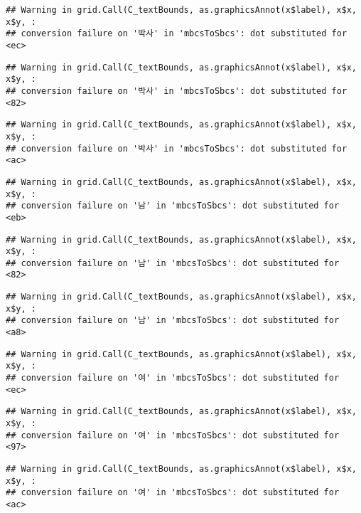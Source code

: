 \documentclass[
]{article}
\begin{document}
\begin{verbatim}
## Warning in grid.Call(C_textBounds, as.graphicsAnnot(x$label), x$x, x$y, :
## conversion failure on '박사' in 'mbcsToSbcs': dot substituted for <ec>
\end{verbatim}

\begin{verbatim}
## Warning in grid.Call(C_textBounds, as.graphicsAnnot(x$label), x$x, x$y, :
## conversion failure on '박사' in 'mbcsToSbcs': dot substituted for <82>
\end{verbatim}

\begin{verbatim}
## Warning in grid.Call(C_textBounds, as.graphicsAnnot(x$label), x$x, x$y, :
## conversion failure on '박사' in 'mbcsToSbcs': dot substituted for <ac>
\end{verbatim}

\begin{verbatim}
## Warning in grid.Call(C_textBounds, as.graphicsAnnot(x$label), x$x, x$y, :
## conversion failure on '남' in 'mbcsToSbcs': dot substituted for <eb>
\end{verbatim}

\begin{verbatim}
## Warning in grid.Call(C_textBounds, as.graphicsAnnot(x$label), x$x, x$y, :
## conversion failure on '남' in 'mbcsToSbcs': dot substituted for <82>
\end{verbatim}

\begin{verbatim}
## Warning in grid.Call(C_textBounds, as.graphicsAnnot(x$label), x$x, x$y, :
## conversion failure on '남' in 'mbcsToSbcs': dot substituted for <a8>
\end{verbatim}

\begin{verbatim}
## Warning in grid.Call(C_textBounds, as.graphicsAnnot(x$label), x$x, x$y, :
## conversion failure on '여' in 'mbcsToSbcs': dot substituted for <ec>
\end{verbatim}

\begin{verbatim}
## Warning in grid.Call(C_textBounds, as.graphicsAnnot(x$label), x$x, x$y, :
## conversion failure on '여' in 'mbcsToSbcs': dot substituted for <97>
\end{verbatim}

\begin{verbatim}
## Warning in grid.Call(C_textBounds, as.graphicsAnnot(x$label), x$x, x$y, :
## conversion failure on '여' in 'mbcsToSbcs': dot substituted for <ac>
\end{verbatim}
\end{document}

